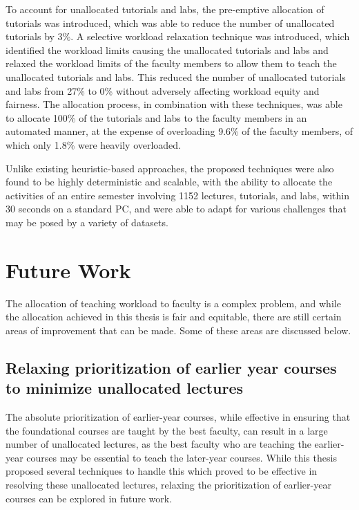 To account for unallocated tutorials and labs, the pre-emptive allocation of tutorials was introduced, which was able to reduce the number of unallocated tutorials by 3\%. A selective workload relaxation technique was introduced, which identified the workload limits causing the unallocated tutorials and labs and relaxed the workload limits of the faculty members to allow them to teach the unallocated tutorials and labs. This reduced the number of unallocated tutorials and labs from 27\% to 0\% without adversely affecting workload equity and fairness. The allocation process, in combination with these techniques, was able to allocate 100\% of the tutorials and labs to the faculty members in an automated manner, at the expense of overloading 9.6\% of the faculty members, of which only 1.8\% were heavily overloaded.

Unlike existing heuristic-based approaches, the proposed techniques were also found to be highly deterministic and scalable, with the ability to allocate the activities of an entire semester involving 1152 lectures, tutorials, and labs, within 30 seconds on a standard PC, and were able to adapt for various challenges that may be posed by a variety of datasets.

\section{Future Work}

The allocation of teaching workload to faculty is a complex problem, and while the allocation achieved in this thesis is fair and equitable, there are still certain areas of improvement that can be made. Some of these areas are discussed below.

\subsection{Relaxing prioritization of earlier year courses to minimize unallocated lectures}

The absolute prioritization of earlier-year courses, while effective in ensuring that the foundational courses are taught by the best faculty, can result in a large number of unallocated lectures, as the best faculty who are teaching the earlier-year courses may be essential to teach the later-year courses. While this thesis proposed several techniques to handle this which proved to be effective in resolving these unallocated lectures, relaxing the prioritization of earlier-year courses can be explored in future work.

